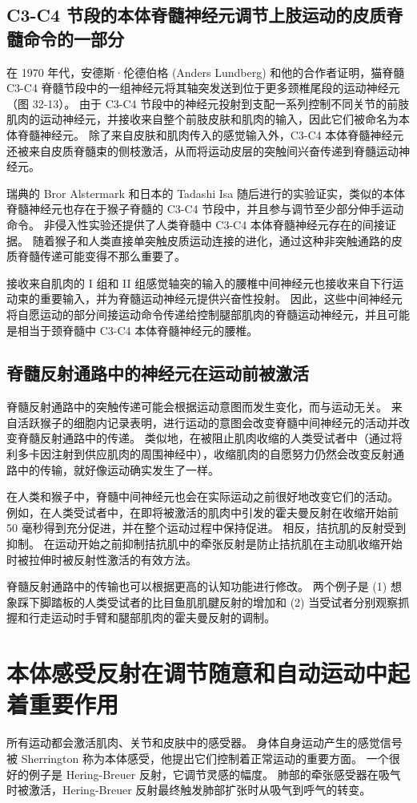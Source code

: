 \subsection{C3-C4 节段的本体脊髓神经元调节上肢运动的皮质脊髓命令的一部分}
在 1970 年代，安德斯·伦德伯格 (Anders Lundberg) 和他的合作者证明，猫脊髓 C3-C4 脊髓节段中的一组神经元将其轴突发送到位于更多颈椎尾段的运动神经元（图 32-13）。 由于 C3-C4 节段中的神经元投射到支配一系列控制不同关节的前肢肌肉的运动神经元，并接收来自整个前肢皮肤和肌肉的输入，因此它们被命名为本体脊髓神经元。 除了来自皮肤和肌肉传入的感觉输入外，C3-C4 本体脊髓神经元还被来自皮质脊髓束的侧枝激活，从而将运动皮层的突触间兴奋传递到脊髓运动神经元。

瑞典的 Bror Alstermark 和日本的 Tadashi Isa 随后进行的实验证实，类似的本体脊髓神经元也存在于猴子脊髓的 C3-C4 节段中，并且参与调节至少部分伸手运动命令。 非侵入性实验还提供了人类脊髓中 C3-C4 本体脊髓神经元存在的间接证据。 随着猴子和人类直接单突触皮质运动连接的进化，通过这种非突触通路的皮质脊髓传递可能变得不那么重要了。

接收来自肌肉的 I 组和 II 组感觉轴突的输入的腰椎中间神经元也接收来自下行运动束的重要输入，并为脊髓运动神经元提供兴奋性投射。 因此，这些中间神经元将自愿运动的部分间接运动命令传递给控制腿部肌肉的脊髓运动神经元，并且可能是相当于颈脊髓中 C3-C4 本体脊髓神经元的腰椎。

\subsection{脊髓反射通路中的神经元在运动前被激活}
脊髓反射通路中的突触传递可能会根据运动意图而发生变化，而与运动无关。 来自活跃猴子的细胞内记录表明，进行运动的意图会改变脊髓中间神经元的活动并改变脊髓反射通路中的传递。 类似地，在被阻止肌肉收缩的人类受试者中（通过将利多卡因注射到供应肌肉的周围神经中），收缩肌肉的自愿努力仍然会改变反射通路中的传输，就好像运动确实发生了一样。

在人类和猴子中，脊髓中间神经元也会在实际运动之前很好地改变它们的活动。 例如，在人类受试者中，在即将被激活的肌肉中引发的霍夫曼反射在收缩开始前 50 毫秒得到充分促进，并在整个运动过程中保持促进。 相反，拮抗肌的反射受到抑制。 在运动开始之前抑制拮抗肌中的牵张反射是防止拮抗肌在主动肌收缩开始时被拉伸时被反射性激活的有效方法。

脊髓反射通路中的传输也可以根据更高的认知功能进行修改。 两个例子是 (1) 想象踩下脚踏板的人类受试者的比目鱼肌肌腱反射的增加和 (2) 当受试者分别观察抓握和行走运动时手臂和腿部肌肉的霍夫曼反射的调制。


\section{本体感受反射在调节随意和自动运动中起着重要作用}
所有运动都会激活肌肉、关节和皮肤中的感受器。 身体自身运动产生的感觉信号被 Sherrington 称为本体感受，他提出它们控制着正常运动的重要方面。 一个很好的例子是 Hering-Breuer 反射，它调节灵感的幅度。 肺部的牵张感受器在吸气时被激活，Hering-Breuer 反射最终触发肺部扩张时从吸气到呼气的转变。

